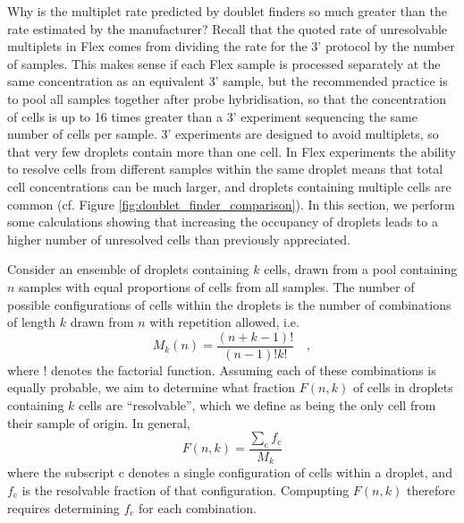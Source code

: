 \documentclass[unnumsec,webpdf,modern,large]{oup-authoring-template}
\begin{document}
	Why is the multiplet rate predicted by doublet finders so much greater than the rate estimated by the manufacturer? 
	Recall that the quoted rate of unresolvable multiplets in Flex comes from dividing the rate for the 3' protocol by the number of samples. 
	This makes sense if each Flex sample is processed separately at the same concentration as an equivalent 3' sample, but the recommended practice is to pool all samples together after probe hybridisation, so that the concentration of cells is up to 16 times greater than a 3' experiment sequencing the same number of cells per sample. 
	3' experiments are designed to avoid multiplets, so that very few droplets contain more than one cell. 
	In Flex experiments the ability to resolve cells from different samples within the same droplet means that total cell concentrations can be much larger, and droplets containing multiple cells are common (cf. Figure \ref{fig:doublet_finder_comparison}). 
	In this section, we perform some calculations showing that increasing the occupancy of droplets leads to a higher number of unresolved cells than previously appreciated.
	
	Consider an ensemble of droplets containing $k$ cells, drawn from a pool containing $n$ samples with equal proportions of cells from all samples. 
	The number of possible configurations of cells within the droplets is the number of combinations of length $k$ drawn from $n$ with repetition allowed, i.e. 
	\begin{equation}
		M_k(n) = \frac{(n + k - 1)!}{(n - 1)! k!} \quad ,
		\label{eq:multiplet_configurations}
	\end{equation}
	where $!$ denotes the factorial function. 
	Assuming each of these combinations is equally probable, we aim to determine what fraction $F(n, k)$ of cells in droplets containing $k$ cells are ``resolvable'', which we define as being the only cell from their sample of origin.
	In general, 
	\begin{equation}
		F(n, k) = \frac{\sum_{\mathrm c} f_{\mathrm c}}{M_k}
		\label{eq:resolvable_fraction_given_k}
	\end{equation}
	where the subscript $\mathrm{c}$ denotes a single configuration of cells within a droplet, and $f_{\mathrm c}$ is the resolvable fraction of that configuration. 
	Compupting $F(n, k)$ therefore requires determining $f_c$ for each combination. 
	
\end{document}
